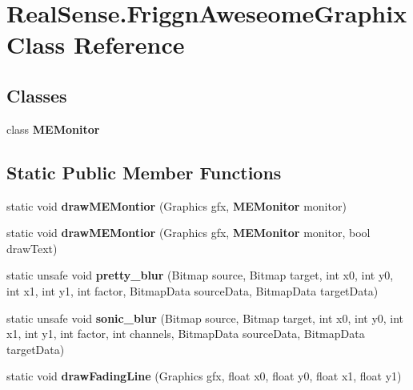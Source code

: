 \section{Real\+Sense.\+Friggn\+Aweseome\+Graphix Class Reference}
\label{class_real_sense_1_1_friggn_aweseome_graphix}
\subsection*{Classes}
\begin{DoxyCompactItemize}
\item 
class \textbf{ M\+E\+Monitor}
\end{DoxyCompactItemize}
\subsection*{Static Public Member Functions}
\begin{DoxyCompactItemize}
\item 
\mbox{\label{class_real_sense_1_1_friggn_aweseome_graphix_a9c50e2b0d08aa7fc1f45ef717a6af85a}} 
static void {\bfseries draw\+M\+E\+Montior} (Graphics gfx, \textbf{ M\+E\+Monitor} monitor)
\item 
\mbox{\label{class_real_sense_1_1_friggn_aweseome_graphix_a25acb9a9102fc1c49ec141ea947acbe8}} 
static void {\bfseries draw\+M\+E\+Montior} (Graphics gfx, \textbf{ M\+E\+Monitor} monitor, bool draw\+Text)
\item 
static unsafe void \textbf{ pretty\+\_\+blur} (Bitmap source, Bitmap target, int x0, int y0, int x1, int y1, int factor, Bitmap\+Data source\+Data, Bitmap\+Data target\+Data)
\item 
static unsafe void \textbf{ sonic\+\_\+blur} (Bitmap source, Bitmap target, int x0, int y0, int x1, int y1, int factor, int channels, Bitmap\+Data source\+Data, Bitmap\+Data target\+Data)
\item 
\mbox{\label{class_real_sense_1_1_friggn_aweseome_graphix_a8aa4c7bc30a55548f69d9a6beeba102f}} 
static void {\bfseries draw\+Fading\+Line} (Graphics gfx, float x0, float y0, float x1, float y1)
\end{DoxyCompactItemize}
